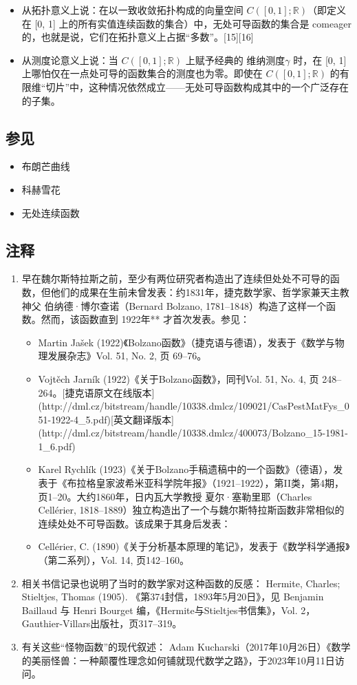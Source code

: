 \begin{itemize}
\item 从拓扑意义上说：在以一致收敛拓扑构成的向量空间 $C([0, 1]; \mathbb{R})$（即定义在 [0, 1] 上的所有实值连续函数的集合）中，无处可导函数的集合是 comeager 的，也就是说，它们在拓扑意义上占据“多数”。[15][16]
\item 从测度论意义上说：当 $C([0, 1]; \mathbb{R})$ 上赋予经典的 维纳测度$\gamma$ 时，在 [0, 1] 上哪怕仅在一点处可导的函数集合的测度也为零。即使在 $C([0, 1]; \mathbb{R})$ 的有限维“切片”中，这种情况依然成立——无处可导函数构成其中的一个广泛存在的子集。
\end{itemize}
\subsection{参见}
\begin{itemize}
\item 布朗芒曲线
\item 科赫雪花
\item 无处连续函数
\end{itemize}
\subsection{注释}
\begin{enumerate}
\item 早在魏尔斯特拉斯之前，至少有两位研究者构造出了连续但处处不可导的函数，但他们的成果在生前未曾发表：约1831年，捷克数学家、哲学家兼天主教神父 伯纳德·博尔查诺（Bernard Bolzano, 1781–1848）构造了这样一个函数。然而，该函数直到 1922年** 才首次发表。参见：
  \begin{itemize}
  \item Martin Jašek (1922)《Bolzano函数》（捷克语与德语），发表于《数学与物理发展杂志》Vol. 51, No. 2, 页 69–76。
  \item Vojtěch Jarník (1922)《关于Bolzano函数》，同刊Vol. 51, No. 4, 页 248–264。[捷克语原文在线版本](http://dml.cz/bitstream/handle/10338.dmlcz/109021/CasPestMatFys_051-1922-4_5.pdf)[英文翻译版本](http://dml.cz/bitstream/handle/10338.dmlcz/400073/Bolzano_15-1981-1_6.pdf)
  \item Karel Rychlík (1923)《关于Bolzano手稿遗稿中的一个函数》（德语），发表于《布拉格皇家波希米亚科学院年报》（1921–1922），第II类，第4期，页1–20。大约1860年，日内瓦大学教授 夏尔·塞勒里耶（Charles Cellérier, 1818–1889）独立构造出了一个与魏尔斯特拉斯函数非常相似的连续处处不可导函数。该成果于其身后发表：
  \item Cellérier, C. (1890)《关于分析基本原理的笔记》，发表于《数学科学通报》（第二系列），Vol. 14, 页142–160。
  \end{itemize}
\item 相关书信记录也说明了当时的数学家对这种函数的反感：
Hermite, Charles; Stieltjes, Thomas (1905). 《第374封信，1893年5月20日》，见 Benjamin Baillaud 与 Henri Bourget 编，《Hermite与Stieltjes书信集》，Vol. 2，Gauthier-Villars出版社，页317–319。
\item 有关这些“怪物函数”的现代叙述：
Adam Kucharski（2017年10月26日）《数学的美丽怪兽：一种颠覆性理念如何铺就现代数学之路》，于2023年10月11日访问。
\end{enumerate}